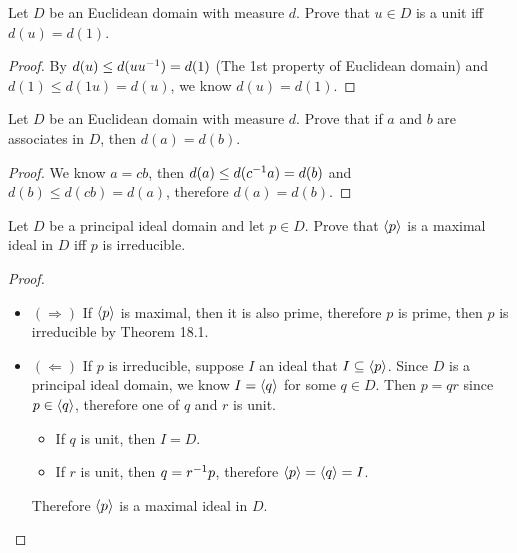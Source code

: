 \documentclass[../main.tex]{subfiles}
\begin{document}
\setcounter{exercise}{7}
\begin{exercise}
  Let $D$ be an Euclidean domain with measure $d$. Prove that
  $u \in D$ is a unit iff $d(u) = d(1)$.
\end{exercise}
\begin{proof}
  By $d(u) \leq d(u u^{-1}) = d(1)$ (The 1st property of Euclidean domain) and
  $d(1) \leq d (1u) = d(u)$, we know $d(u) = d(1)$.
\end{proof}

\begin{exercise}
  Let $D$ be an Euclidean domain with measure $d$. Prove that
  if $a$ and $b$ are associates in $D$, then $d(a) = d(b)$.
\end{exercise}
\begin{proof}
  We know $a = cb$, then $d(a) \leq d(c^{-1}a) = d(b)$
  and $d(b) \leq d(cb) = d(a)$, therefore $d(a) = d(b)$.
\end{proof}

\begin{exercise}
  Let $D$ be a principal ideal domain and let $p \in D$.
  Prove that $\langle p \rangle$ is a maximal ideal in $D$ iff $p$ is irreducible.
\end{exercise}
\begin{proof}
  ~
  \begin{itemize}
    \item $(\Rightarrow)$ If $\langle p \rangle$ is maximal, then it is also prime,
          therefore $p$ is prime, then $p$ is irreducible by Theorem 18.1.
    \item $(\Leftarrow)$ If $p$ is irreducible, suppose $I$ an ideal that $I \subseteq \langle p \rangle$.
          Since $D$ is a principal ideal domain, we know $I = \langle q \rangle$ for some $q \in D$.
          Then $p = qr$ since $p \in \langle q \rangle$, therefore one of $q$ and $r$ is unit.
          \begin{itemize}
            \item If $q$ is unit, then $I = D$.
            \item If $r$ is unit, then $q = r^{-1}p$, therefore $\langle p \rangle = \langle q \rangle = I$.
          \end{itemize}
          Therefore $\langle p \rangle$ is a maximal ideal in $D$.
  \end{itemize}
\end{proof}
\end{document}
